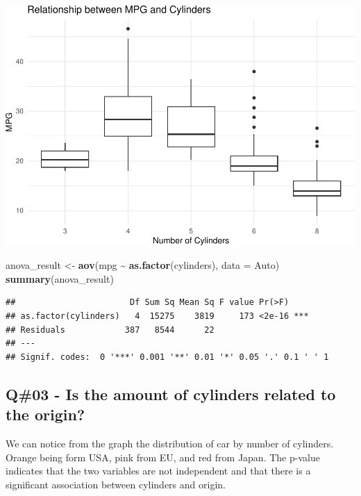 \documentclass[
]{article}
\newenvironment{Shaded}{\begin{snugshade}}{\end{snugshade}}
\newcommand{\AttributeTok}[1]{\textcolor[rgb]{0.13,0.29,0.53}{#1}}
\newcommand{\FunctionTok}[1]{\textcolor[rgb]{0.13,0.29,0.53}{\textbf{#1}}}
\newcommand{\NormalTok}[1]{#1}
\newcommand{\OtherTok}[1]{\textcolor[rgb]{0.56,0.35,0.01}{#1}}
\newcommand{\SpecialCharTok}[1]{\textcolor[rgb]{0.81,0.36,0.00}{\textbf{#1}}}
\begin{document}
\includegraphics{QuestionCar_files/figure-latex/unnamed-chunk-2-1.pdf}

\begin{Shaded}
\begin{Highlighting}[]
\NormalTok{anova\_result }\OtherTok{\textless{}{-}} \FunctionTok{aov}\NormalTok{(mpg }\SpecialCharTok{\textasciitilde{}} \FunctionTok{as.factor}\NormalTok{(cylinders), }\AttributeTok{data =}\NormalTok{ Auto)}
\FunctionTok{summary}\NormalTok{(anova\_result)}
\end{Highlighting}
\end{Shaded}

\begin{verbatim}
##                       Df Sum Sq Mean Sq F value Pr(>F)    
## as.factor(cylinders)   4  15275    3819     173 <2e-16 ***
## Residuals            387   8544      22                   
## ---
## Signif. codes:  0 '***' 0.001 '**' 0.01 '*' 0.05 '.' 0.1 ' ' 1
\end{verbatim}

\newpage

\hypertarget{q03---is-the-amount-of-cylinders-related-to-the-origin}{%
\subsection{Q\#03 - Is the amount of cylinders related to the
origin?}\label{q03---is-the-amount-of-cylinders-related-to-the-origin}}

We can notice from the graph the distribution of car by number of
cylinders. Orange being form USA, pink from EU, and red from Japan. The
p-value indicates that the two variables are not independent and that
there is a significant association between cylinders and origin.
\end{document}
